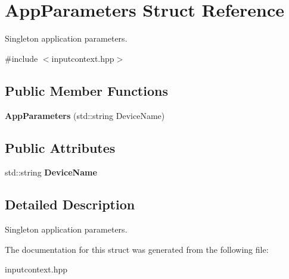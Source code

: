 \hypertarget{structAppParameters}{}\section{App\+Parameters Struct Reference}
\label{structAppParameters}


Singleton application parameters.  




{\ttfamily \#include $<$inputcontext.\+hpp$>$}

\subsection*{Public Member Functions}
\begin{DoxyCompactItemize}
\item 
\mbox{\label{structAppParameters_af57a6cb625e39067c6549c57a6687515}} 
{\bfseries App\+Parameters} (std\+::string Device\+Name)
\end{DoxyCompactItemize}
\subsection*{Public Attributes}
\begin{DoxyCompactItemize}
\item 
\mbox{\label{structAppParameters_a81ba7491c03de963b16decf6a7684905}} 
std\+::string {\bfseries Device\+Name}
\end{DoxyCompactItemize}


\subsection{Detailed Description}
Singleton application parameters. 

The documentation for this struct was generated from the following file\+:\begin{DoxyCompactItemize}
\item 
inputcontext.\+hpp\end{DoxyCompactItemize}
